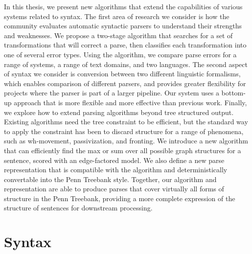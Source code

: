 In this thesis, we present new algorithms that extend the capabilities of various systems related to syntax.
The first area of research we consider is how the community evaluates automatic syntactic parsers to understand their strengths and weaknesses.
We propose a two-stage algorithm that searches for a set of transformations that will correct a parse, then classifies each transformation into one of several error types.
Using the algorithm, we compare parse errors for a range of systems, a range of text domains, and two languages.
The second aspect of syntax we consider is conversion between two different linguistic formalisms, which enables comparison of different parsers, and provides greater flexibility for projects where the parser is part of a larger pipeline.
Our system uses a bottom-up approach that is more flexible and more effective than previous work.
Finally, we explore how to extend parsing algorithms beyond tree structured output.
Existing algorithms need the tree constraint to be efficient, but the standard way to apply the constraint has been to discard structure for a range of phenomena, such as wh-movement, passivization, and fronting.
We introduce a new algorithm that can efficiently find the max or sum over all possible graph structures for a sentence, scored with an edge-factored model.
We also define a new parse representation that is compatible with the algorithm and deterministically convertable into the Penn Treebank style.
Together, our algorithm and representation are able to produce parses that cover virtually all forms of structure in the Penn Treebank, providing a more complete expression of the structure of sentences for downstream processing.

\section{Syntax}
\label{sec:syntax}


